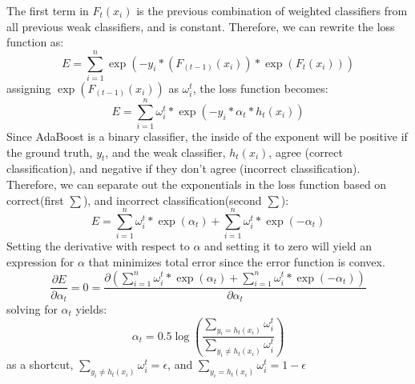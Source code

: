 \documentclass[10pt,twocolumn,letterpaper]{article}
\begin{document}
\indent The first term in $F_t(x_i) $ is the previous combination of weighted classifiers from all previous weak classifiers, and is constant. Therefore, we can rewrite the loss function as:
\begin{equation}
E = \sum_{i=1}^{n}\exp(-y_i*(F_{(t-1)}(x_i))*\exp(F_t(x_i)))
\end{equation}
assigning $\exp(F_{(t-1)}(x_i))$ as $\omega_i^{t}$,
the loss function becomes:
\begin{equation}
E = \sum_{i=1}^{n}\omega_i^{t}*\exp(-y_i*\alpha_t*h_t(x_i))
\end{equation}
\indent Since AdaBoost is a binary classifier, the inside of the exponent will be positive if the ground truth, $y_t$, and the weak classifier, $h_t(x_i)$, agree (correct classification), and negative if they don't agree (incorrect classification). Therefore, we can separate out the exponentials in the loss function based on correct(first $\sum$), and incorrect classification(second $\sum$):
\begin{equation}
E = \sum_{i=1}^{n}\omega_i^{t}*\exp(\alpha_t) +  \sum_{i=1}^{n}\omega_i^{t}*\exp(-\alpha_t)
\end{equation}
Setting the derivative with respect to $\alpha$ and setting it to zero will yield an expression for $\alpha$ that minimizes total error since the error function is convex.
\begin{equation}
\frac{\partial E}{\partial \alpha_t}=0 = \frac{\partial (\sum_{i=1}^{n}\omega_i^{t}*\exp(\alpha_t) +  \sum_{i=1}^{n}\omega_i^{t}*\exp(-\alpha_t))}{\partial \alpha_t} 
\end{equation}
solving for $\alpha_t$ yields\cite{schapire1999improved}:
\begin{equation}
\alpha_t = 0.5\log\left(\frac{\sum_{y_i=h_t(x_i)} \omega_i^{t}}{\sum_{y_i \ne h_t(x_i)} \omega_i^{t}}\right)
\end{equation}
as a shortcut, $\sum_{y_i \ne h_t(x_i)} \omega_i^{t} = \epsilon$,
and $\sum_{y_i = h_t(x_i)} \omega_i^{t} = 1-\epsilon$
\end{document}
